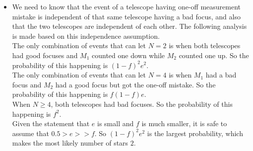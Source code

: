 \documentclass[11pt]{article}
\begin{document}
\begin{onehalfspace}
\begin{itemize}
	\item
	We need to know that the event of a telescope having one-off measurement mistake is independent of that same telescope having a bad focus, and also that the two telescopes are independent of each other. The following analysis is made based on this independence assumption.\\
	The only combination of events that can let $N=2$ is when both telescopes had good focuses and $M_1$ counted one down while $M_2$ counted one up. So the probability of this happening is $(1-f)^2e^2$.\\
	The only combination of events that can let $N=4$ is when $M_1$ had a bad focus and $M_2$ had a good focus but got the one-off mistake. So the probability of this happening is $f(1-f)e$.\\
	When $N \geq 4$, both telescopes had bad focuses. So the probability of this happening is $f^2$.\\
	Given the statement that $e$ is small and $f$ is much smaller, it is safe to assume that $0.5 > e >> f$. So $(1-f)^2e^2$ is the largest probability, which makes the most likely number of stars $2$.
\end{itemize}

\end{onehalfspace}
\end{document}
